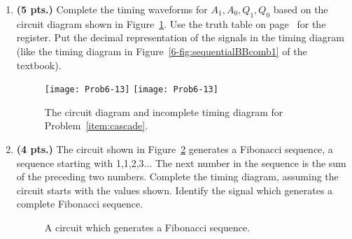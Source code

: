 \begin{enumerate}
    \item\textbf{ (5 pts.)} Complete the timing waveforms for $A_1, A_0, Q_1, Q_0$
        \label{item:cascade}
        based on the circuit diagram shown in Figure~\ref{fig:cascade}.  Use the truth
        table on page~\pageref{6-page:reg} for the register. Put the decimal
        representation of the signals in the timing diagram (like the timing
        diagram in Figure~\ref{6-fig:sequentialBBcomb1} of the textbook).\needspace{2.2in}
        \begin{figure}[ht]
            \ifshowanswers \texttt{[image: Prob6-13]}
            \else \texttt{[image: Prob6-13]} \fi
            \caption{The circuit diagram and incomplete timing diagram for
            Problem~\ref{item:cascade}.}
            \label{fig:cascade}
        \end{figure}

        \needspace{2in}
    \item\textbf{ (4 pts.)} The circuit shown in Figure~\ref{fig:fib} generates a
        Fibonacci sequence, a sequence starting with 1,1,2,3...  The next number in
        the sequence is the sum of the preceding two numbers.  Complete the
        timing diagram, assuming the circuit starts with the values shown.
        Identify the signal which generates a complete Fibonacci sequence.

        \begin{figure}[ht]
            \caption{A circuit which generates a Fibonacci sequence.}
            \label{fig:fib}
        \end{figure}

\end{enumerate}
